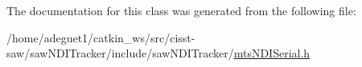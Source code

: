 The documentation for this class was generated from the following file\-:\begin{DoxyCompactItemize}
\item 
/home/adeguet1/catkin\-\_\-ws/src/cisst-\/saw/saw\-N\-D\-I\-Tracker/include/saw\-N\-D\-I\-Tracker/\hyperlink{mts_n_d_i_serial_8h}{mts\-N\-D\-I\-Serial.\-h}\end{DoxyCompactItemize}
